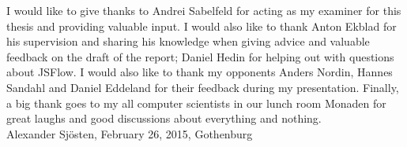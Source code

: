 \thispagestyle{empty}

\begin{acknowledgements}
I would like to give thanks to Andrei Sabelfeld for acting as my examiner for this thesis and providing valuable input. I would also like to thank Anton Ekblad for his supervision and sharing his knowledge when giving advice and valuable feedback on the draft of the report; Daniel Hedin for helping out with questions about JSFlow. I would also like to thank my opponents Anders Nordin, Hannes Sandahl and Daniel Eddeland for their feedback during my presentation. Finally, a big thank goes to my all computer scientists in our lunch room Monaden for great laughs and good discussions about everything and nothing. \\[1cm]

\hfill Alexander Sjösten, February 26, 2015, Gothenburg
\end{acknowledgements}
